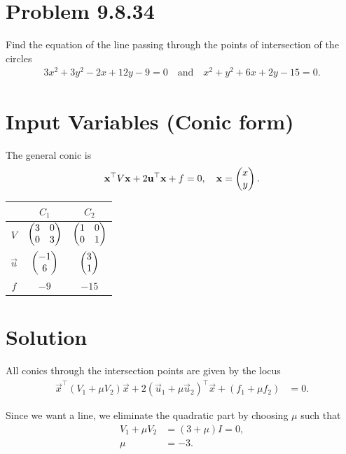 \documentclass[12pt]{article}
\begin{document}
\section*{Problem 9.8.34}
Find the equation of the line passing through the points of intersection of the circles
\begin{align}
3x^2+3y^2-2x+12y-9=0
\quad\text{and}\quad
x^2+y^2+6x+2y-15=0.
\end{align}

\section*{Input Variables (Conic form)}
The general conic is
\begin{align}
\mathbf{x}^\top V \mathbf{x} + 2\mathbf{u}^\top \mathbf{x} + f = 0, 
\quad \mathbf{x}=\begin{pmatrix}x\\y\end{pmatrix}.
\end{align}

\begin{table}[H]
\centering
\begin{tabular}{|c|c|c|}
\hline
 & $C_1$ & $C_2$ \\
\hline
$V$ & $\begin{pmatrix}3 & 0 \\ 0 & 3\end{pmatrix}$ & $\begin{pmatrix}1 & 0 \\ 0 & 1\end{pmatrix}$ \\
\hline
$\vec{u}$ & $\begin{pmatrix}-1 \\ 6\end{pmatrix}$ & $\begin{pmatrix}3 \\ 1\end{pmatrix}$ \\
\hline
$f$ & $-9$ & $-15$ \\
\hline
\end{tabular}
\end{table}

\section*{Solution}

All conics through the intersection points are given by the locus
\begin{align}
\vec{x}^\top (V_1+\mu V_2)\vec{x}
+2(\vec{u}_1+\mu\vec{u}_2)^\top\vec{x}
+(f_1+\mu f_2) &= 0.
\end{align}

Since we want a line, we eliminate the quadratic part by choosing $\mu$ such that
\begin{align}
V_1+\mu V_2 &= (3+\mu)I = 0, \\
\mu &= -3.
\end{align}
\end{document}
